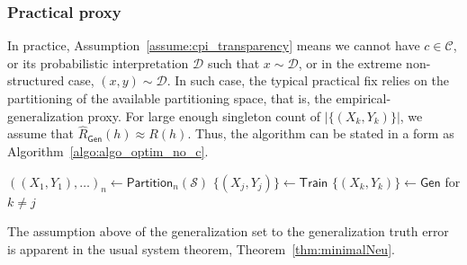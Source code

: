 \documentclass[10pt]{article} %
\begin{document}
\subsubsection{Practical proxy}

In practice, Assumption~\ref{assume:cpi_transparency} means we cannot have $c\in\mathcal{C}$, or its probabilistic interpretation $\mathcal{D}$ such that $x\sim\mathcal{D}$, or in the extreme non-structured case, $(x,y)\sim \mathcal{D}$. In such case, the typical practical fix relies on the partitioning of the available partitioning space, that is, the empirical-generalization proxy. For large enough singleton count of $|\{(X_{k},Y_{k})\}|$, we assume that $\hat{R}_{\mathsf{Gen}}(h)\approx R(h)$. Thus, the algorithm can be stated in a form as Algorithm~\ref{algo:algo_optim_no_c}.

\begin{algorithm}[htb]
    \renewcommand{\algorithmcfname}{Optimization problem}
    \caption{Empirical-generalization learning dynamics (proxy)}
    \Begin
    {
        $((X_{1},Y_{1}),\dots)_{n}\gets\mathsf{Partition}_{n}(\mathcal{S})$\;
        $\{(X_{j},Y_{j})\}\gets \mathsf{Train}$\;
        $\{(X_{k},Y_{k})\}\gets \mathsf{Gen}$ for $k\ne j$\;
    }
    \label{algo:algo_optim_no_c}
\end{algorithm}

The assumption above of the generalization set to the generalization truth error is apparent in the usual system theorem, Theorem~\ref{thm:minimalNeu}.
\end{document}
